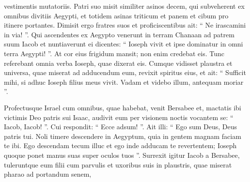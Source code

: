\begin{biblechapter}
\begin{biblechapter}
\begin{biblechapter}
\begin{biblechapter}
\begin{biblechapter}
\begin{biblechapter}
\begin{biblechapter}
\begin{biblechapter}
\begin{biblechapter}
\begin{biblechapter}
\begin{biblechapter}
\begin{biblechapter}
\begin{biblechapter}
\begin{biblechapter}
\begin{biblechapter}
\begin{biblechapter}
\begin{biblechapter}
\begin{biblechapter}
\begin{biblechapter}
\begin{biblechapter}
\begin{biblechapter}
\begin{biblechapter}
\begin{biblechapter}
\begin{biblechapter}
\begin{biblechapter}
\begin{biblechapter}
\begin{biblechapter}
\begin{biblechapter}
\begin{biblechapter}
\begin{biblechapter}
\begin{biblechapter}
\begin{biblechapter}
\begin{biblechapter}
\begin{biblechapter}
\begin{biblechapter}
\begin{biblechapter}
\begin{biblechapter}
\begin{biblechapter}
\begin{biblechapter}
\begin{biblechapter}
\begin{biblechapter}
\begin{biblechapter}
\begin{biblechapter}
\begin{biblechapter}
\begin{biblechapter}
\verse vestimentis mutatoriis. Patri suo misit similiter asinos decem, qui subveherent ex omnibus divitiis Aegypti, et totidem asinas triticum et panem et cibum pro itinere portantes. 
\verse Dimisit ergo fratres suos et proficiscentibus ait: “ Ne irascamini in via! ”.
 \verse Qui ascendentes ex Aegypto venerunt in terram Chanaan ad patrem suum Iacob 
 \verse et nuntiaverunt ei dicentes: “ Ioseph vivit et ipse dominatur in omni terra Aegypti! ”. At cor eius frigidum mansit; non enim credebat eis. 
\verse Tunc referebant omnia verba Ioseph, quae dixerat eis. Cumque vidisset plaustra et universa, quae miserat ad adducendum eum, revixit spiritus eius, 
\verse et ait: “ Sufficit mihi, si adhuc Ioseph filius meus vivit. Vadam et videbo illum, antequam moriar ”.
 
\begin{biblechapter}
\verse Profectusque Israel cum omnibus, quae habebat, venit Bersabee et, mactatis ibi victimis Deo patris sui Isaac, 
\verse audivit eum per visionem noctis vocantem se: “ Iacob, Iacob! ”. Cui respondit: “ Ecce adsum! ”. 
\verse Ait illi: “ Ego sum Deus, Deus patris tui. Noli timere descendere in Aegyptum, quia in gentem magnam faciam te ibi. 
\verse Ego descendam tecum illuc et ego inde adducam te revertentem; Ioseph quoque ponet manus suas super oculos tuos ”.
 \verse Surrexit igitur Iacob a Bersabee, tuleruntque eum filii cum parvulis et uxoribus suis in plaustris, quae miserat pharao ad portandum senem, 

\end{biblechapter}
\end{biblechapter}
\end{biblechapter}
\end{biblechapter}
\end{biblechapter}
\end{biblechapter}
\end{biblechapter}
\end{biblechapter}
\end{biblechapter}
\end{biblechapter}
\end{biblechapter}
\end{biblechapter}
\end{biblechapter}
\end{biblechapter}
\end{biblechapter}
\end{biblechapter}
\end{biblechapter}
\end{biblechapter}
\end{biblechapter}
\end{biblechapter}
\end{biblechapter}
\end{biblechapter}
\end{biblechapter}
\end{biblechapter}
\end{biblechapter}
\end{biblechapter}
\end{biblechapter}
\end{biblechapter}
\end{biblechapter}
\end{biblechapter}
\end{biblechapter}
\end{biblechapter}
\end{biblechapter}
\end{biblechapter}
\end{biblechapter}
\end{biblechapter}
\end{biblechapter}
\end{biblechapter}
\end{biblechapter}
\end{biblechapter}
\end{biblechapter}
\end{biblechapter}
\end{biblechapter}
\end{biblechapter}
\end{biblechapter}
\end{biblechapter}

